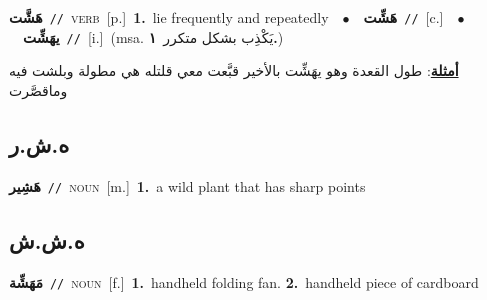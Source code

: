 \documentclass[10pt,a4paper,twoside]{article} %
\begin{document}
\begin{multicols}{2}
{\setlength\topsep{0pt}\textbf{\foreignlanguage{arabic}{هَشَّت}}\ {\color{gray}\texttt{//}\color{black}}\ \textsc{verb}\ [p.]\ \textbf{1.}~lie frequently and repeatedly\ \ $\bullet$\ \ \setlength\topsep{0pt}\textbf{\foreignlanguage{arabic}{هَشِّت}}\ {\color{gray}\texttt{//}\color{black}}\ [c.]\ \ $\bullet$\ \ \setlength\topsep{0pt}\textbf{\foreignlanguage{arabic}{يهَشِّت}}\ {\color{gray}\texttt{//}\color{black}}\ [i.]\ \color{gray}(msa. \foreignlanguage{arabic}{يَكْذِب بشكل متكرر}~\foreignlanguage{arabic}{\textbf{١.}})\color{black}\  \begin{flushright}\color{gray}\foreignlanguage{arabic}{\textbf{\underline{\foreignlanguage{arabic}{أمثلة}}}: طول القعدة وهو يهَشِّت بالأخير قبَّعت معي قلتله هي مطولة وبلشت فيه وماقصَّرت}\end{flushright}\color{black}} \vspace{2mm}

\vspace{-3mm}
\subsection*{\color{blue}\foreignlanguage{arabic}{ه.ش.ر}\color{blue}{}} 

{\setlength\topsep{0pt}\textbf{\foreignlanguage{arabic}{هَشِير}}\ {\color{gray}\texttt{//}\color{black}}\ \textsc{noun}\ [m.]\ \textbf{1.}~a wild plant that has sharp points\ } \vspace{2mm}

\vspace{-3mm}
\subsection*{\color{blue}\foreignlanguage{arabic}{ه.ش.ش}\color{blue}{}} 

{\setlength\topsep{0pt}\textbf{\foreignlanguage{arabic}{مَهَشِّة}}\ {\color{gray}\texttt{//}\color{black}}\ \textsc{noun}\ [f.]\ \textbf{1.}~handheld folding fan.  \textbf{2.}~handheld piece of cardboard\ } \vspace{2mm}


\end{multicols}
\end{document}
